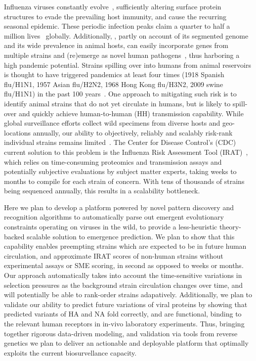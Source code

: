 \documentclass[onecolumn, compsoc,12pt]{IEEEtran}
\begin{document}
  
Influenza viruses constantly evolve~\cite{dos2016influenza}, sufficiently altering surface protein structures to evade the prevailing host immunity, and cause the recurring seasonal  epidemic. These periodic  infection peaks claim a quarter to half a million lives~\cite{huddleston2020integrating} globally. Additionally, \infl, partly on account of its segmented genome and its wide prevalence in animal hosts, can easily incorporate genes from multiple strains and (re)emerge as novel human pathogens~\cite{reid2003origin}, thus harboring  a high pandemic potential. Strains spilling over into humans from animal reservoirs is thought to have triggered  pandemics  at least four times (1918 Spanish flu/H1N1, 1957 Asian flu/H2N2, 1968 Hong Kong flu/H3N2, 2009 swine flu/H1N1) in the past 100 years~\cite{shao2017evolution}. One  approach to mitigating such risk is to identify  animal strains  that do not yet circulate in humans, but is likely to spill-over and quickly achieve human-to-human (HH) transmission capability. While global surveillance efforts collect wild specimens from diverse hosts and geo-locations annually, our  ability to objectively, reliably and scalably  risk-rank individual strains remains limited~\cite{wille2021accurately}. The Center for Disease Control's (CDC) current solution to this problem is the Influenza Risk Assessment Tool (IRAT)~\cite{Influenz24:online}, which relies on time-consuming proteomics and transmission assays and potentially subjective evaluations by subject matter experts, taking  weeks to months to compile for each strain of concern. With tens of   thousands of strains being sequenced annually, this results in  a scalability bottleneck. 

Here we plan to develop a platform powered by novel pattern discovery and recognition algorithms to automatically parse out emergent evolutionary constraints operating on \infl viruses in the wild, to provide a less-heuristic theory-backed scalable solution to emergence prediction. %
We plan to show   that this capability enables preempting  strains which are expected to be in future human circulation, and  approximate IRAT scores of non-human strains without  experimental assays or SME scoring, in second as opposed to weeks or months. Our approach automatically takes into account the time-sensitive variations in selection pressures as the background strain circulation changes over time, and will potentially be able to rank-order strains adapatively. Additionally, we plan to validate our ability to predict future variations of viral proteins by showing that predicted variants of HA and NA fold correctly, and are functional, binding to the relevant human receptors in in-vivo laboratory experiments. Thus, bringing together rigorous data-driven modeling, and validation via tools from reverse genetics we plan to deliver an actionable and deployable platform that optimally exploits the current biosurvellance capacity.
\end{document}
